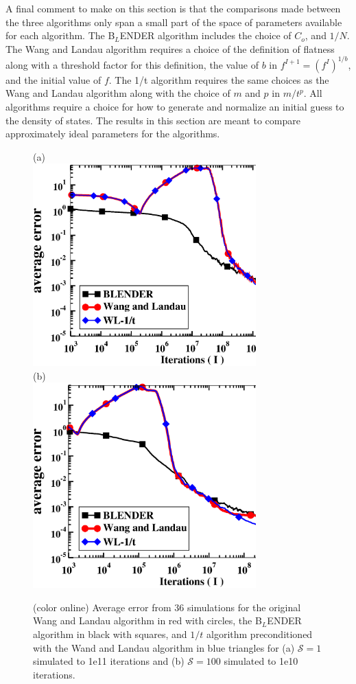 \documentclass[aps,pre,reprint,superscriptaddress,showkeys]{revtex4-2}
\begin{document}
  A final comment to make on this section is that the comparisons made between the three algorithms only span a small part of the space of parameters available for each algorithm.  The B$_L$ENDER algorithm includes the choice of $C_o$, and $1/N$. The Wang and Landau algorithm requires a choice of the definition of flatness along with a threshold factor for this definition, the value of $b$ in $f^{I+1}= (f^I)^{1/b}$, and  the initial value of $f$. The 1/t algorithm requires the same choices as the Wang and Landau algorithm along with the choice of $m$ and $p$ in $m/t^p$. All algorithms require a choice for how to generate and normalize an initial guess to the density of states.  The results in this section are meant to compare approximately ideal parameters for the algorithms. 
\begin{figure}[h!]
(a)\\
\vspace{1cm}
\includegraphics[width=8.6cm]{fig4a.eps}\\
\vspace{1cm}
(b)\\
\vspace{1cm}
\includegraphics[width=8.6cm]{fig4b.eps}\\
\caption{(color online) Average error from 36 simulations for the original Wang and Landau algorithm in red with circles, the B$_L$ENDER  algorithm in black with squares, and $1/t$ algorithm preconditioned with the Wand and Landau algorithm in blue triangles for (a) $\mathcal{S}=1$ simulated to 1e11 iterations and (b) $\mathcal{S}=100$ simulated to 1e10 iterations. \label{compare_blender_wl}}
\end{figure}
\end{document}
